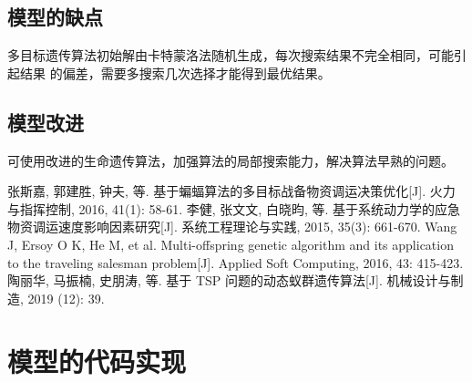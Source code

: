 \documentclass{whutmod}
\begin{document}
  \subsection{模型的缺点}
  
多目标遗传算法初始解由卡特蒙洛法随机生成，每次搜索结果不完全相同，可能引起结果 的偏差，需要多搜索几次选择才能得到最优结果。

  \subsection{模型改进}
  
可使用改进的生命遗传算法，加强算法的局部搜索能力，解决算法早熟的问题。

  
  
  
 
	\newpage	%
	\nocite{*}		%
%
%	
\begin{thebibliography}{9}%
	张斯嘉, 郭建胜, 钟夫, 等. 基于蝙蝠算法的多目标战备物资调运决策优化[J]. 火力与指挥控制, 2016, 41(1): 58-61.
	李健, 张文文, 白晓昀, 等. 基于系统动力学的应急物资调运速度影响因素研究[J]. 系统工程理论与实践, 2015, 35(3): 661-670.	
	Wang J, Ersoy O K, He M, et al. Multi-offspring genetic algorithm and its application to the traveling salesman problem[J]. Applied Soft Computing, 2016, 43: 415-423.
	陶丽华, 马振楠, 史朋涛, 等. 基于 TSP 问题的动态蚁群遗传算法[J]. 机械设计与制造, 2019 (12): 39.
\end{thebibliography}

	\newpage
	\appendix %

\section{模型的代码实现}
\end{document}
